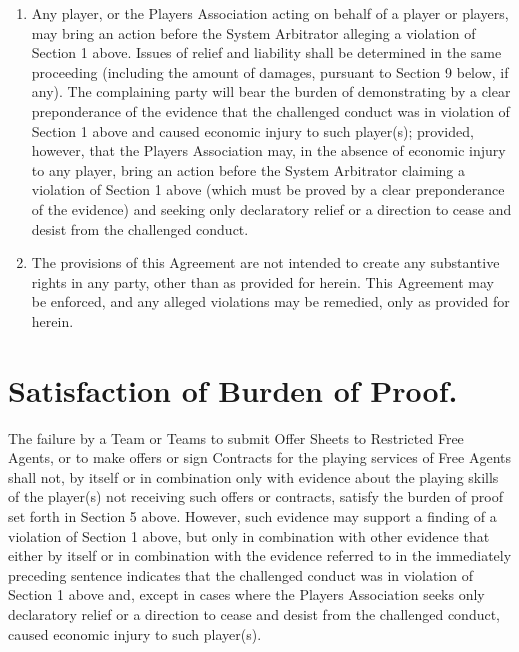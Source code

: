 \documentclass[
]{book}
\providecommand{\tightlist}{%
  \setlength{\itemsep}{0pt}\setlength{\parskip}{0pt}}
\begin{document}
\begin{enumerate}
\def\labelenumi{(\alph{enumi})}
\tightlist
\item
  Any player, or the Players Association acting on behalf of a player or players, may bring an action before the System Arbitrator alleging a violation of Section 1 above. Issues of relief and liability shall be determined in the same proceeding (including the amount of damages, pursuant to Section 9 below, if any). The complaining party will bear the burden of demonstrating by a clear preponderance of the evidence that the challenged conduct was in violation of Section 1 above and caused economic injury to such player(s); provided, however, that the Players Association may, in the absence of economic injury to any player, bring an action before the System Arbitrator claiming a violation of Section 1 above (which must be proved by a clear preponderance of the evidence) and seeking only declaratory relief or a direction to cease and desist from the challenged conduct.
\item
  The provisions of this Agreement are not intended to create any substantive rights in any party, other than as provided for herein. This Agreement may be enforced, and any alleged violations may be remedied, only as provided for herein.
\end{enumerate}

\hypertarget{satisfaction-of-burden-of-proof.}{%
\section{Satisfaction of Burden of Proof.}\label{satisfaction-of-burden-of-proof.}}

The failure by a Team or Teams to submit Offer Sheets to Restricted Free Agents, or to make offers or sign Contracts for the playing services of Free Agents shall not, by itself or in combination only with evidence about the playing skills of the player(s) not receiving such offers or contracts, satisfy the burden of proof set forth in Section 5 above. However, such evidence may support a finding of a violation of Section 1 above, but only in combination with other evidence that either by itself or in combination with the evidence referred to in the immediately preceding sentence indicates that the challenged conduct was in violation of Section 1 above and, except in cases where the Players Association seeks only declaratory relief or a direction to cease and desist from the challenged conduct, caused economic injury to such player(s).
\end{document}
